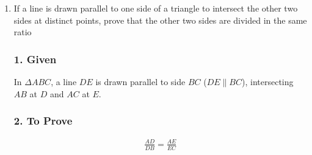 \begin{enumerate}[label=\thesubsection.\arabic*, ref=\thesubsection.\theenumi]
		 Radius of each spherical ball ($r$) = $0.5\text{ cm} = \frac{1}{2}\text{ cm}$
		
		Let the rise in the water level be $h\text{ cm}$.
	
	\subsection*{Formulae}
	\begin{enumerate}
		\item Volume of a sphere = $\dfrac{4}{3}\pi r^3$ 
		\item Volume of a cylinder = $\pi R^2 h$ 
	\end{enumerate}
	
	
	
	The volume of water raised in the cylindrical vessel is equal to the total volume of $9000$ spherical balls dropped into it:
	$
	\text{Volume of raised water in cylinder} = 9000 \times \text{Volume of one spherical ball}
	$
	
	Substitute the respective geometric formulae:
	$
	\pi R^2 h = 9000 \times \left( \frac{4}{3} \pi r^3 \right)
	$
	
	Cancel $\pi$ from both sides:
	$$
	R^2 h = 9000 \times \frac{4}{3} \times r^3
	$$
	
	Substitute $R = 10$ and $r = 0.5$:
	$$
	(10)^2 \times h = 9000 \times \frac{4}{3} \times (0.5)^3
	$$
	
	Simplify the terms:
	$$
	100 \times h = 3000 \times 4 \times 0.125
	$$
	$$
	100 \times h = 12000 \times 0.125
	$$
	$$
	100 \times h = 1500
	$$
	
	Solve for $h$:
	$$
	h = \frac{1500}{100} = 15\text{ cm}$$
	
	
	
	The rise in the level of water in the vessel is 15cm.
	
	\item If a line is drawn parallel to one side of a triangle to intersect the other two sides at distinct points, prove that the other two sides are divided in the same ratio
	
	\solution
	
	
	\subsubsection*{1. Given}
	In $\Delta ABC$, a line $DE$ is drawn parallel to side $BC$ ($DE \parallel BC$), intersecting $AB$ at $D$ and $AC$ at $E$.
	
	\subsubsection*{2. To Prove}
	\begin{align}
		\frac{AD}{DB} = \frac{AE}{EC}
	\end{align}
	

\end{enumerate}
